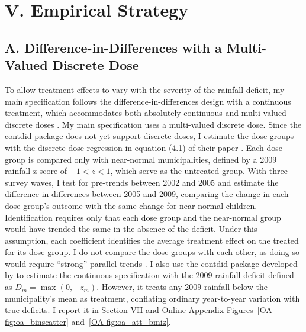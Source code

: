 \section*{V. Empirical Strategy}\label{sec:V}

\subsection*{A. Difference-in-Differences with a Multi-Valued Discrete Dose}

To allow treatment effects to vary with the severity of the rainfall deficit, my main specification follows the difference-in-differences design with a continuous treatment, which accommodates both absolutely continuous and multi-valued discrete doses \parencite{callawayDifferenceinDifferencesContinuousTreatment2024}. My main specification uses a multi-valued discrete dose. Since the \href{https://bcallaway11.github.io/contdid/}{contdid package} does not yet support discrete doses, I estimate the dose groups with the discrete-dose regression in equation (4.1) of their paper \parencite{callawayDifferenceinDifferencesContinuousTreatment2024}. Each dose group is compared only with near-normal municipalities, defined by a 2009 rainfall z-score of $-1 < z < 1$, which serve as the untreated group. With three survey waves, I test for pre-trends between 2002 and 2005 and estimate the difference-in-differences between 2005 and 2009, comparing the change in each dose group's outcome with the same change for near-normal children. Identification requires only that each dose group and the near-normal group would have trended the same in the absence of the deficit. Under this assumption, each coefficient identifies the average treatment effect on the treated for its dose group. I do not compare the dose groups with each other, as doing so would require ``strong'' parallel trends \parencite{callawayDifferenceinDifferencesContinuousTreatment2024}. I also use the contdid package developed by \textcite{callawayDifferenceinDifferencesContinuousTreatment2026} to estimate the continuous specification with the 2009 rainfall deficit defined as $D_m = \max(0, -z_m)$. However, it treats any 2009 rainfall below the municipality's mean as treatment, conflating ordinary year-to-year variation with true deficits. I report it in Section \hyperref[sec:VII]{VII} and Online Appendix Figures~\ref{OA-fig:oa_binscatter} and~\ref{OA-fig:oa_att_bmiz}.

